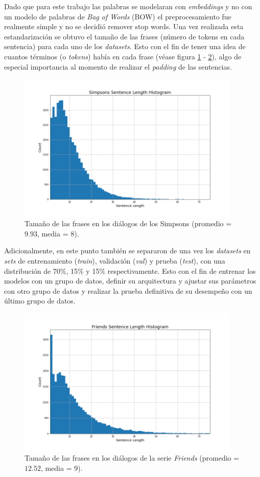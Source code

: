 Dado que para este trabajo las palabras se modelaran con \textit{embeddings} y no con un modelo de palabras de \textit{Bag of Words} (BOW) el preprocesamiento fue realmente simple y no se decidió remover stop words. Una vez realizada esta estandarización se obtuvo el tamaño de las frases (número de tokens en cada sentencia) para cada uno de los \textit{datasets}. Esto con el fin de tener una idea de cuantos términos (o \textit{tokens}) había en cada frase (véase figura \ref{fig:simpsons_hist} - \ref{fig:friends_hist}), algo de especial importancia al momento de realizar el \textit{padding} de las sentencias.  \\

\begin{figure}[H]
    \centering
    \includegraphics[width=0.95\textwidth]{results/preprocessing/simpsons_hist.png}
    \caption{Tamaño de las frases en los diálogos de los Simpsons (promedio = $9.93$, media = $8$).}
    \label{fig:simpsons_hist}
\end{figure}

Adicionalmente, en este punto también se separaron de una vez los \textit{datasets} en \textit{sets} de entrenamiento (\textit{train}), validación (\textit{val}) y prueba (\textit{test}), con una distribución de 70\%, 15\% y 15\% respectivamente. Esto con el fin de entrenar los modelos con un grupo de datos, definir su arquitectura y ajustar sus parámetros con otro grupo de datos y realizar la prueba definitiva de su desempeño con un último grupo de datos. 


\begin{figure}[H]
    \centering
    \includegraphics[width=0.95\textwidth]{results/preprocessing/friends_hist.png}
    \caption{Tamaño de las frases en los diálogos de la serie \textit{Friends} (promedio = $12.52$, media = $9$).}
    \label{fig:friends_hist}
\end{figure}

\newpage